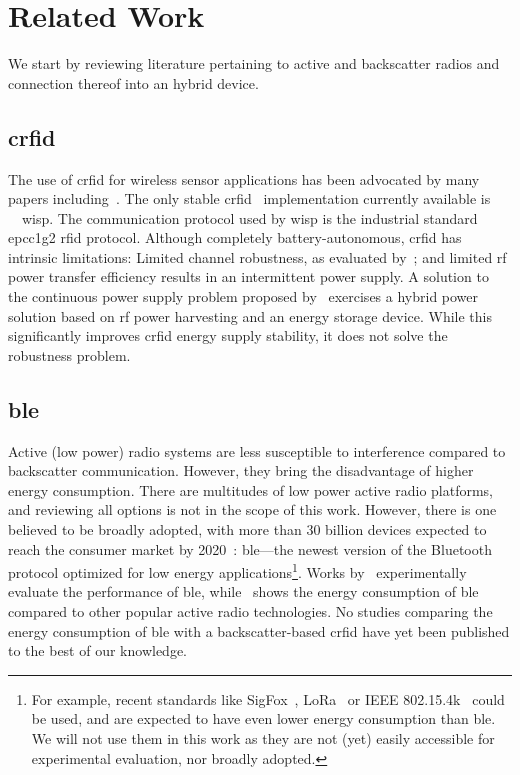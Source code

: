 \documentclass[conference,letterpaper,twoside,final,10pt]{IEEEtran}
\begin{document}
\section{Related Work}
\label{sec:related_work}

We start by reviewing literature pertaining to active and backscatter radios and connection thereof into an hybrid device.

\subsection{\acl{crfid}}
\label{sec:related_work/backscatter}

The use of \acs{crfid} for wireless sensor applications has been advocated by many papers including~\cite{yeager2008rfid,philipose2005pervasive}.
The only stable \ac{crfid}~\cite{sample2008im} implementation currently available is {~~}\ac{wisp}.
The communication protocol used by \ac{wisp} is the industrial standard \ac{epcc1g2} \ac{rfid} protocol. Although completely battery-autonomous, \ac{crfid} has intrinsic limitations:
Limited channel robustness, as evaluated by~\cite{zhang2012mobisys}; and limited \ac{rf} power transfer efficiency results in an intermittent power supply.
A solution to the continuous power supply problem proposed by~\cite{dong2015rfid} exercises a hybrid power solution based on \ac{rf} power harvesting and an energy storage device.
While this significantly improves \ac{crfid} energy supply stability, it does not solve the robustness problem.

\subsection{\acl{ble}}
\label{sec:related_work/active}

Active (low power) radio systems are less susceptible to interference compared to backscatter communication.
However, they bring the disadvantage of higher energy consumption.
There are multitudes of low power active radio platforms, and reviewing all options is not in the scope of this work.
However, there is one believed to be broadly adopted, with more than 30 billion devices expected to reach the consumer market by 2020~\cite{ble2015standard}: \ac{ble}---the newest version of the Bluetooth protocol optimized for low energy applications\footnote{For example, recent standards like SigFox~\cite{sigfox2015web}, LoRa~\cite{lora2015web} or IEEE 802.15.4k~\cite{ieee2013802154k} could be used, and are expected to have even lower energy consumption than \ac{ble}.
We will not use them in this work as they are not (yet) easily accessible for experimental evaluation, nor broadly adopted.}.
Works by~\cite{gomez2012sensors,kamath2010an092} experimentally evaluate the performance of \ac{ble}, while~\cite{siekkinen2012wcncw} shows the energy consumption of \ac{ble} compared to other popular active radio technologies.
No studies comparing the energy consumption of \ac{ble} with a backscatter-based \ac{crfid} have yet been published to the best of our knowledge.
\end{document}
